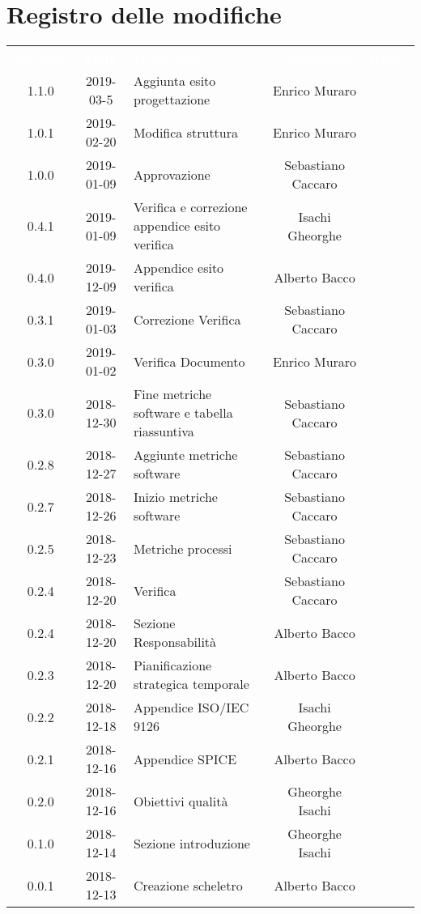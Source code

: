 \section*{Registro delle modifiche}
{
	\renewcommand{\arraystretch}{1.5}
	\centering
	\begin{longtable}{c c C{4cm} c  c }
		\textcolor{white}{\textbf{Versione}} &
		\textcolor{white}{\textbf{Data}} &
		\textcolor{white}{\textbf{Descrizione}} &
		\textcolor{white}{\textbf{Nominativo}} &
		\textcolor{white}{\textbf{Ruolo}}
		\\
		1.1.0 &
		2019-03-5 &
		Aggiunta esito progettazione &
		Enrico Muraro &
		\reda{}
		\\
		1.0.1 &
		2019-02-20 &
		Modifica struttura &
		Enrico Muraro &
		\reda{}
		\\
		1.0.0 &
		2019-01-09 &
		Approvazione &
		Sebastiano Caccaro &
		\Res{}
		\\
		0.4.1 &
		2019-01-09 &
		Verifica e correzione appendice esito verifica &
		Isachi Gheorghe &
		\ver{}
		\\
		0.4.0 &
		2019-12-09 &
		Appendice esito verifica &
		Alberto Bacco &
		\ver{}
		\\
		0.3.1 &
		2019-01-03 &
		Correzione Verifica &
		Sebastiano Caccaro &
		\reda{}
		\\
		0.3.0 &
		2019-01-02 &
		Verifica Documento &
		Enrico Muraro &
		\ver{}
		\\
		0.3.0 &
		2018-12-30 &
		Fine metriche software e tabella riassuntiva &
		Sebastiano Caccaro &
		\reda{}
		\\
		0.2.8 &
		2018-12-27 &
		Aggiunte metriche software  &
		Sebastiano Caccaro &
		\reda{}
		\\
		0.2.7 &
		2018-12-26 &
		Inizio metriche software &
		Sebastiano Caccaro &
		\reda{}
		\\
		0.2.5 &
		2018-12-23 &
		Metriche processi &
		Sebastiano Caccaro &
		\reda{}
		\\
		0.2.4 &
		2018-12-20 &
		Verifica &
		Sebastiano Caccaro &
		\reda{}		
		\\
		0.2.4 &
		2018-12-20 &
		Sezione Responsabilità &
		Alberto Bacco &
		\reda{}
		\\
		0.2.3 &
		2018-12-20 &
		Pianificazione strategica temporale &
		Alberto Bacco &
		\reda{}
		\\
		0.2.2 &
		2018-12-18 &
		Appendice ISO/IEC 9126 &
		Isachi Gheorghe &
		\reda{}
		\\
		0.2.1 &
		2018-12-16 &
		Appendice SPICE &
		Alberto Bacco &
		\reda{}
		\\
		0.2.0 &
		2018-12-16 &
		Obiettivi qualità &
		Gheorghe Isachi &
		\reda{}
		\\
		0.1.0 &
		2018-12-14 &
		Sezione introduzione &
		Gheorghe Isachi&
		\reda{}
		\\
		0.0.1 &
		2018-12-13 &
		Creazione scheletro &
		Alberto Bacco&
		\reda{}
		\\
	\end{longtable}

}